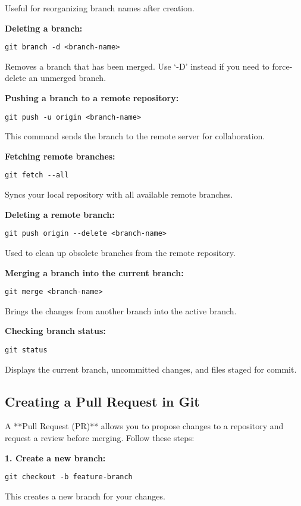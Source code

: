 Useful for reorganizing branch names after creation.

\textbf{Deleting a branch:}
\begin{lstlisting}
git branch -d <branch-name>
\end{lstlisting}

Removes a branch that has been merged. Use `-D' instead if you need to force-delete an unmerged branch.

\textbf{Pushing a branch to a remote repository:}
\begin{lstlisting}
git push -u origin <branch-name>
\end{lstlisting}

This command sends the branch to the remote server for collaboration.

\textbf{Fetching remote branches:}
\begin{lstlisting}
git fetch --all
\end{lstlisting}

Syncs your local repository with all available remote branches.

\textbf{Deleting a remote branch:}
\begin{lstlisting}
git push origin --delete <branch-name>
\end{lstlisting}

Used to clean up obsolete branches from the remote repository.

\textbf{Merging a branch into the current branch:}
\begin{lstlisting}
git merge <branch-name>
\end{lstlisting}

Brings the changes from another branch into the active branch.

\textbf{Checking branch status:}
\begin{lstlisting}
git status
\end{lstlisting}

Displays the current branch, uncommitted changes, and files staged for commit.

\subsection{Creating a Pull Request in Git}

A **Pull Request (PR)** allows you to propose changes to a repository and request a review before merging. Follow these steps:

\textbf{1. Create a new branch:}
\begin{lstlisting}
git checkout -b feature-branch
\end{lstlisting}
This creates a new branch for your changes.

